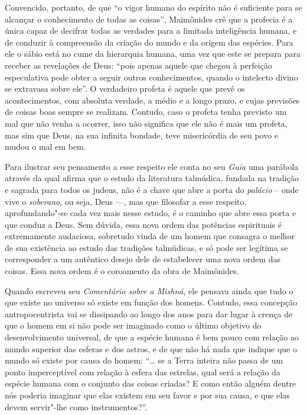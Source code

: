 Convencido, portanto, de que ``o vigor humano do espírito não é
suficiente para se alcançar o conhecimento de todas as coisas'',
Maimônides crê que a profecia é a única capaz de decifrar todas as
verdades para a limitada inteligência humana, e de conduzir à
compreensão da criação do mundo e da origem das espécies. Para ele o
sábio está no cume da hierarquia humana, uma vez que este se prepara
para receber as revelações de Deus: ``pois apenas aquele que chegou à
perfeição especulativa pode obter a seguir outros conhecimentos, quando
o intelecto divino se extravasa sobre ele''. O verdadeiro profeta é
aquele que prevê os acontecimentos, com absoluta verdade, a médio e a
longo prazo, e cujas previsões de coisas boas sempre se realizam.
Contudo, caso o profeta tenha previsto um mal que não venha a ocorrer,
isso não significa que ele não é mais um profeta, mas sim que Deus, na
sua infinita bondade, teve misericórdia de seu povo e mudou o mal em
bem.

Para ilustrar seu pensamento a esse respeito ele conta no seu
\emph{Guia} uma parábola através da qual afirma que o estudo da
literatura talmúdica, fundada na tradição e sagrada para todos os
judeus, não é a chave que abre a porta do \emph{palácio} -- onde vive o
\emph{soberano}, ou seja, Deus ---, mas que filosofar a esse respeito,
aprofundando"-se cada vez mais nesse estudo, é o caminho que abre essa
porta e que conduz a Deus. Sem dúvida, essa nova ordem das potências
espirituais é extremamente audaciosa, sobretudo vinda de um homem que
consagra o melhor de sua existência ao estudo das tradições talmúdicas,
e só pode ser legítima se corresponder a um autêntico desejo dele de
estabelecer uma nova ordem das coisas. Essa nova ordem é o coroamento
da obra de Maimônides.

Quando escreveu seu \emph{Comentário sobre a Mishná}, ele pensava ainda
que tudo o que existe no universo só existe em função dos homens.
Contudo, essa concepção antropocentrista vai se dissipando ao longo dos
anos para dar lugar à crença de que o homem em si não pode ser imaginado
como o último objetivo do desenvolvimento universal, de que a espécie
humana é bem pouco com relação ao mundo superior das esferas e dos
astros, e de que não há nada que indique que o mundo só existe por causa
do homem: ``\ldots{} se a Terra inteira não passa de um ponto imperceptível
com relação à esfera das estrelas, qual será a relação da espécie
humana com o conjunto das coisas criadas? E como então alguém dentre nós
poderia imaginar que elas existem em seu favor e por sua causa, e que
elas devem servir"-lhe como instrumentos?''.

